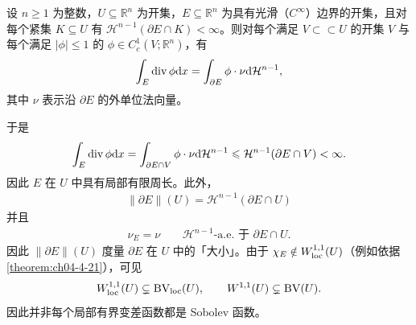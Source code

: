 \documentclass[../../main.tex]{subfiles}%
\begin{document}
\begin{example}\label{example:ch05-exa-5-1-光滑集}
设 $n\geqslant1$ 为整数，$U\subseteq\mathbb{R}^n$ 为开集，$E\subseteq\mathbb{R}^n$ 为具有光滑（$C^{\infty}$）边界的开集，且对每个紧集 $K\subseteq U$ 有 $\mathcal{H}^{n-1}(\partial E\cap K)<\infty$。则对每个满足 $V\subset\subset U$ 的开集 $V$ 与每个满足 $\lvert\phi\rvert\leqslant1$ 的 $\phi\in C_c^1(V;\mathbb{R}^n)$，有
\begin{align*}
\int_E\operatorname{div}\phi\mathrm{d} x=\int_{\partial E}\phi\cdot\nu\mathrm{d}\mathcal{H}^{n-1},
\end{align*}
其中 $\nu$ 表示沿 $\partial E$ 的外单位法向量。
\end{example}

\begin{solution}
于是
\begin{align*}
\int_E\operatorname{div}\phi\mathrm{d} x=\int_{\partial E\cap V}\phi\cdot\nu\mathrm{d}\mathcal{H}^{n-1}\leqslant\mathcal{H}^{n-1}(\partial E\cap V)<\infty .
\end{align*}
因此 $E$ 在 $U$ 中具有局部有限周长。此外，
\begin{align*}
\lVert\partial E\rVert(U)=\mathcal{H}^{n-1}(\partial E\cap U)
\end{align*}
并且
\begin{align*}
\nu_E=\nu\qquad\mathcal{H}^{n-1}\text{-a.e. 于 }\partial E\cap U .
\end{align*}
因此 $\lVert\partial E\rVert(U)$ 度量 $\partial E$ 在 $U$ 中的「大小」。由于 $\chi_E\notin W^{1,1}_{\mathrm{loc}}(U)$（例如依据\cref{theorem:ch04-4-21}），可见%
\begin{align*}
W^{1,1}_{\mathrm{loc}}(U)\subsetneq\mathrm{BV}_{\mathrm{loc}}(U),\qquad W^{1,1}(U)\subsetneq\mathrm{BV}(U).
\end{align*}
因此并非每个局部有界变差函数都是 Sobolev 函数。
\end{solution}
\end{document}
